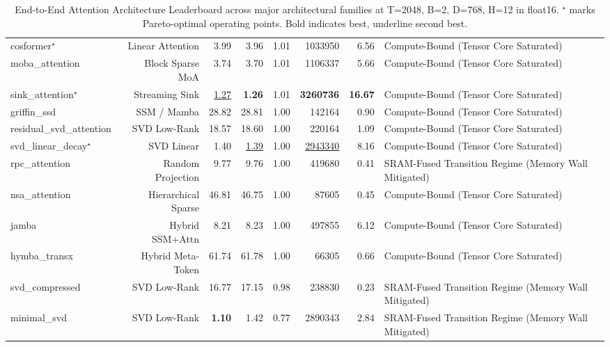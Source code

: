 \begin{table}[t]
\begin{tabular}{lrrrrrrl}
cosformer$^\star$ & Linear Attention & 3.99 & 3.96 & 1.01 & 1033950 & 6.56 & Compute-Bound (Tensor Core Saturated) \\
moba\_attention & Block Sparse MoA & 3.74 & 3.70 & 1.01 & 1106337 & 5.66 & Compute-Bound (Tensor Core Saturated) \\
sink\_attention$^\star$ & Streaming Sink & \underline{1.27} & \textbf{1.26} & 1.01 & \textbf{3260736} & \textbf{16.67} & Compute-Bound (Tensor Core Saturated) \\
griffin\_ssd & SSM / Mamba & 28.82 & 28.81 & 1.00 & 142164 & 0.90 & Compute-Bound (Tensor Core Saturated) \\
residual\_svd\_attention & SVD Low-Rank & 18.57 & 18.60 & 1.00 & 220164 & 1.09 & Compute-Bound (Tensor Core Saturated) \\
svd\_linear\_decay$^\star$ & SVD Linear & 1.40 & \underline{1.39} & 1.00 & \underline{2943340} & 8.16 & Compute-Bound (Tensor Core Saturated) \\
rpc\_attention & Random Projection & 9.77 & 9.76 & 1.00 & 419680 & 0.41 & SRAM-Fused Transition Regime (Memory Wall Mitigated) \\
nsa\_attention & Hierarchical Sparse & 46.81 & 46.75 & 1.00 & 87605 & 0.45 & Compute-Bound (Tensor Core Saturated) \\
jamba & Hybrid SSM+Attn & 8.21 & 8.23 & 1.00 & 497855 & 6.12 & Compute-Bound (Tensor Core Saturated) \\
hymba\_transx & Hybrid Meta-Token & 61.74 & 61.78 & 1.00 & 66305 & 0.66 & Compute-Bound (Tensor Core Saturated) \\
svd\_compressed & SVD Low-Rank & 16.77 & 17.15 & 0.98 & 238830 & 0.23 & SRAM-Fused Transition Regime (Memory Wall Mitigated) \\
minimal\_svd & SVD Low-Rank & \textbf{1.10} & 1.42 & 0.77 & 2890343 & 2.84 & SRAM-Fused Transition Regime (Memory Wall Mitigated) \\
\bottomrule
\end{tabular}
\caption{End-to-End Attention Architecture Leaderboard across major architectural families at T=2048, B=2, D=768, H=12 in float16. $^\star$ marks Pareto-optimal operating points. Bold indicates best, underline second best.}
\label{tab:attention_architecture_leaderboard}
\end{table}

